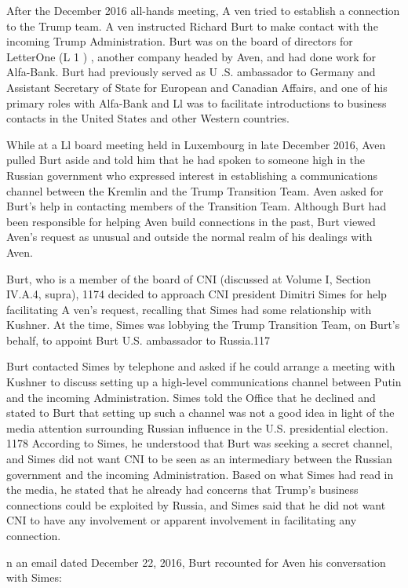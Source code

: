 After the December 2016 all-hands meeting, A ven tried to establish a connection to the Trump team. A ven instructed Richard Burt to make contact with the incoming Trump Administration. Burt was on the board of directors for LetterOne (L 1 ) , another company headed by Aven, and had done work for Alfa-Bank.%
Burt had previously served as U .S. ambassador to Germany and Assistant Secretary of State for European and Canadian Affairs, and one of his primary roles with Alfa-Bank and Ll was to facilitate introductions to business contacts in the United States and other Western countries.%

While at a Ll board meeting held in Luxembourg in late December 2016, Aven pulled Burt aside and told him that he had spoken to someone high in the Russian government who expressed interest in establishing a communications channel between the Kremlin and the Trump Transition Team.%
Aven asked for Burt's help in contacting members of the Transition Team.%
Although Burt had been responsible for helping Aven build connections in the past, Burt viewed Aven's request as unusual and outside the normal realm of his dealings with Aven.%

Burt, who is a member of the board of CNI (discussed at Volume I, Section IV.A.4, supra), 1174 decided to approach CNI president Dimitri Simes for help facilitating A ven's request, recalling that Simes had some relationship with Kushner.%
At the time, Simes was lobbying the Trump Transition Team, on Burt's behalf, to appoint Burt U.S. ambassador to Russia.117

Burt contacted Simes by telephone and asked if he could arrange a meeting with Kushner to discuss setting up a high-level communications channel between Putin and the incoming Administration.%
Simes told the Office that he declined and stated to Burt that setting up such a channel was not a good idea in light of the media attention surrounding Russian influence in the U.S. presidential election. 1178 According to Simes, he understood that Burt was seeking a secret channel, and Simes did not want CNI to be seen as an intermediary between the Russian government and the incoming Administration.%
Based on what Simes had read in the media, he stated that he already had concerns that Trump's business connections could be exploited by Russia, and Simes said that he did not want CNI to have any involvement or apparent involvement in facilitating any connection.%

n an email dated December 22, 2016, Burt recounted for Aven his conversation with Simes:

